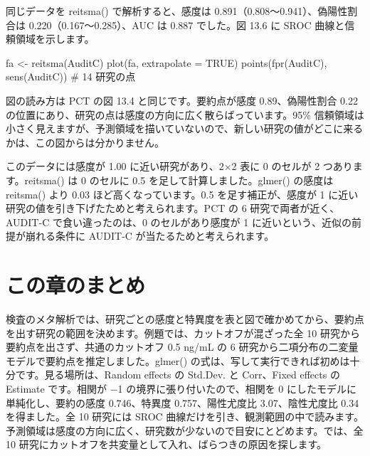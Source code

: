 同じデータを reitsma() で解析すると、感度は 0.891（0.808〜0.941）、偽陽性割合は 0.220（0.167〜0.285）、AUC は 0.887 でした。図 13.6 に SROC 曲線と信頼領域を示します。


\begin{rcode}
fa <- reitsma(AuditC)
plot(fa, extrapolate = TRUE)
points(fpr(AuditC), sens(AuditC))   # 14 研究の点
\end{rcode}

図の読み方は PCT の図 13.4 と同じです。要約点が感度 0.89、偽陽性割合 0.22 の位置にあり、研究の点は感度の方向に広く散らばっています。95\% 信頼領域は小さく見えますが、予測領域を描いていないので、新しい研究の値がどこに来るかは、この図からは分かりません。

このデータには感度が 1.00 に近い研究があり、2×2 表に 0 のセルが 2 つあります。reitsma() は 0 のセルに 0.5 を足して計算しました。glmer() の感度は reitsma() より 0.03 ほど高くなっています。0.5 を足す補正が、感度が 1 に近い研究の値を引き下げたためと考えられます。PCT の 6 研究で両者が近く、AUDIT-C で食い違ったのは、0 のセルがあり感度が 1 に近いという、近似の前提が崩れる条件に AUDIT-C が当たるためと考えられます。

\section{この章のまとめ}
\label{sec:13-10}

検査のメタ解析では、研究ごとの感度と特異度を表と図で確かめてから、要約点を出す研究の範囲を決めます。例題では、カットオフが混ざった全 10 研究から要約点を出さず、共通のカットオフ 0.5 ng/mL の 6 研究から二項分布の二変量モデルで要約点を推定しました。glmer() の式は、写して実行できれば初めは十分です。見る場所は、Random effects の Std.Dev. と Corr、Fixed effects の Estimate です。相関が −1 の境界に張り付いたので、相関を 0 にしたモデルに単純化し、要約の感度 0.746、特異度 0.757、陽性尤度比 3.07、陰性尤度比 0.34 を得ました。全 10 研究には SROC 曲線だけを引き、観測範囲の中で読みます。予測領域は感度の方向に広く、研究数が少ないので目安にとどめます。では、全 10 研究にカットオフを共変量として入れ、ばらつきの原因を探します。
